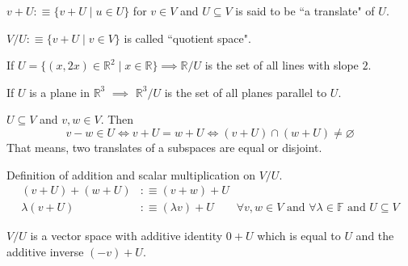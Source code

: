 \setcounter{thm}{94}
\begin{mydef}
  $v+U :\equiv \{v+U \mid u\in U\}$ for $v\in V$ and $U\subseteq V$ is said to be ``a translate" of $U$.
\end{mydef}

\setcounter{thm}{98}
\begin{mydef}
  $V/U :\equiv \{v+U \mid v\in V\}$ is called ``quotient space".
\end{mydef}

\begin{example}
  If $U=\{ (x,2x)\in \mathbb{R}^2 \mid x\in \mathbb{R} \} \implies \mathbb{R}/U$ is the set of all lines with slope $2$.
\end{example}

\begin{example}
  If $U$ is a plane in $\mathbb{R}^3$ $\implies$ $\mathbb{R}^3/U$ is the set of all planes parallel to $U$.
\end{example}


\setcounter{thm}{100}
\begin{thm}
  $ U \subseteq V$ and $v,w\in V$. Then
  \begin{equation}
    v-w \in U \iff v+U = w + U \iff (v+U) \cap (w+U) \neq \varnothing
  \end{equation}
  That means, two translates of a subspaces are equal or disjoint.
\end{thm}

\begin{mydef}
  Definition of addition and scalar multiplication on $V/U$.
  \begin{equation}
    \begin{aligned}
      (v+U)+(w+U) & :\equiv (v+w) + U \\
      \lambda (v+U) & :\equiv (\lambda v) + U \qquad \forall v,w \in V \text{ and } \forall \lambda \in \mathbb{F}
      \text{ and } U \subseteq V
    \end{aligned}
  \end{equation}
\end{mydef}


\begin{thm}
  $V/U$ is a vector space with additive identity $0+U$ which is equal to $U$ and the additive inverse $(-v)+U$.
\end{thm}

